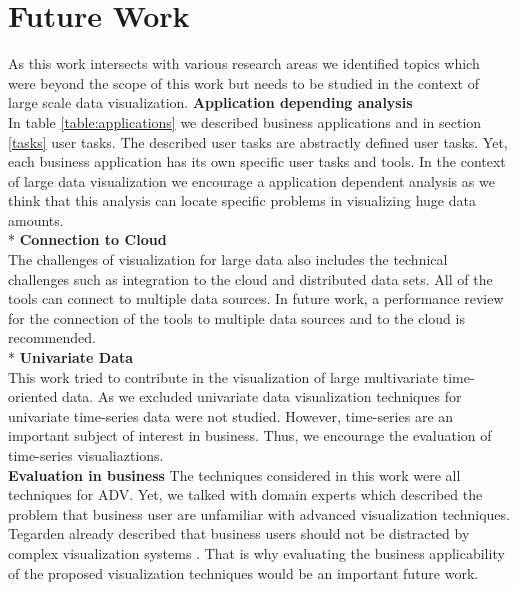 \section{Future Work}
As this work intersects with various research areas we identified topics which were beyond the scope of this work but needs to be studied in the context of large scale data visualization. 
\textbf{Application depending analysis}\\
In table \ref{table:applications} we described business applications and in section \ref{tasks} user tasks. The described user tasks are abstractly defined user tasks. Yet, each business application has its own specific user tasks and tools. In the context of large data visualization we encourage a application dependent analysis as we think that this analysis can locate specific problems in visualizing huge data amounts. \\*
\textbf{Connection to Cloud}\\
The challenges of visualization for large data also includes the technical challenges such as integration to the cloud and distributed data sets. All of the tools can connect to multiple data sources. In future work, a performance review for the connection of the tools to multiple data sources and to the cloud is recommended. \\*
\textbf{Univariate Data}\\
This work tried to contribute in the visualization of large multivariate time-oriented data. As we excluded univariate data visualization techniques for univariate time-series data were not studied. However, time-series are an important subject of interest in business. Thus, we encourage the evaluation of time-series visualiaztions.\\
\textbf{Evaluation in business}
The techniques considered in this work were all techniques for ADV. Yet, we talked with domain experts which described the problem that business user are unfamiliar with advanced visualization techniques. Tegarden already described that business users should not be distracted by complex visualization systems \cite{Tegarden1999}. That is why evaluating the business applicability of the proposed visualization techniques would be an important future work. 






